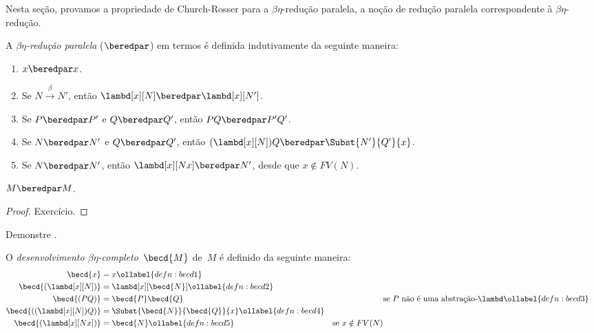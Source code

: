 \documentclass[../../../include/open-logic-section]{subfiles}
\begin{document}


Nesta seção, provamos a propriedade de Church-Rosser para a
$\beta\eta$-redução paralela, a noção de redução paralela correspondente à
$\beta\eta$-redução.

\begin{defn} 
  A \emph{$\beta\eta$-redução paralela} ($\beredpar$) em termos é definida
  indutivamente da seguinte maneira:
  \begin{enumerate}
    \item {} $x \beredpar x$.
    \item {} Se $N \xrightarrow{\beta} N'$, então
      $\lambd[x][N] \beredpar \lambd[x][N']$.
    \item {} Se $P \beredpar P'$ e $Q \beredpar Q'$, então
      $PQ \beredpar P'Q'$.
    \item {} Se $N \beredpar N'$ e $Q \beredpar Q'$, então
      $(\lambd[x][N])Q \beredpar \Subst{N'}{Q'}{x}$.
    \item {} Se $N \beredpar N'$, então
      $\lambd[x][Nx] \beredpar N'$, desde que $x \notin FV(N)$.
  \end{enumerate}
\end{defn}

\begin{thm}
  $M \beredpar M$.
\end{thm}

\begin{proof}
  Exercício.
\end{proof}

\begin{prob}
Demonstre .
\end{prob}

\begin{defn}
  O \emph{desenvolvimento $\beta\eta$-completo}~$\becd{M}$ de~$M$ é
  definido da seguinte maneira:
  \begin{align}
    \becd{x} &= x \ollabel{defn:becd1} \\
    \becd{(\lambd[x][N])} &= \lambd[x][\becd{N}] \ollabel{defn:becd2}\\
    \becd{(PQ)} &= \becd{P}\becd{Q} && \text{se $P$ não é uma abstração-$\lambd$}
    \ollabel{defn:becd3} \\
    \becd{((\lambd[x][N])Q)} &= \Subst{\becd{N}}{\becd{Q}}{x}
                             \ollabel{defn:becd4} \\
    \becd{(\lambd[x][Nx])} &= \becd{N} \ollabel{defn:becd5} & \text{se $x
                                                      \notin FV(N)$}
  \end{align}
\end{defn}
\end{document}
